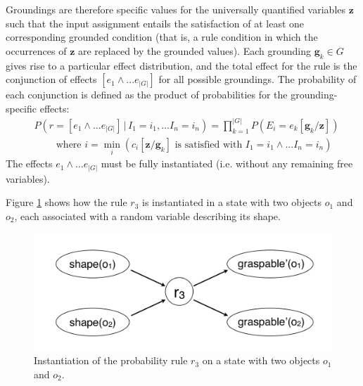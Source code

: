  Groundings are therefore specific values for the universally quantified variables $\mathbf{z}$ such that the input assignment entails the satisfaction of at least one corresponding grounded condition (that is, a rule condition in which the occurrences of $\mathbf{z}$ are replaced by the grounded values). Each grounding $\mathbf{g}_k \in G$ gives rise to a particular effect distribution, and the total effect for the rule is the conjunction of effects $[e_1 \land ... e_{|G|}]$ for all possible groundings.  The probability of each conjunction is defined as the product of probabilities for the grounding-specific effects:
\begin{align}
& P(r\!=\![e_1 \land ... e_{|G|}] \, | \, I_1\!=\!i_1,... I_n\!=\!i_n) = \prod_{k=1}^{|G|} P(E_i = e_k[\mathbf{g}_k / \mathbf{z}]) \label{eq:quantifruledistrib}
 \\
& \; \; \; \; \; \; \; \; \text{where } i = \min_i (c_i[\mathbf{z} / \mathbf{g}_k]\text{ is satisfied with } I_1\!=\!i_1 \land ... I_n\!=\!i_n) \nonumber
\end{align}
The effects $e_1 \land ... e_{|G|}$ must be fully instantiated (i.e. without any remaining free variables).  %

Figure \ref{fig:quantinstantitionprob} shows how the rule $r_3$ is instantiated in a state with two objects $o_1$ and $o_2$, each associated with a random variable describing its shape.

\begin{figure}[h]
\centering
\includegraphics[scale=0.25]{imgs/quantruleinstantiation.pdf}
\caption{Instantiation of the probability rule $r_3$ on a state with two objects $o_1$ and $o_2$.}
\label{fig:quantinstantitionprob}
\end{figure}

